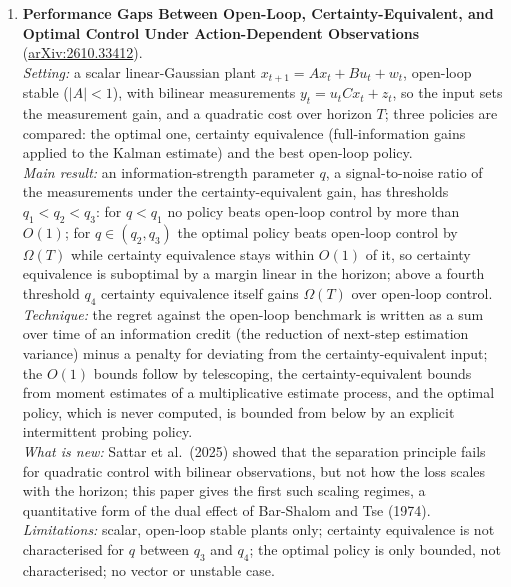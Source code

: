 \documentclass[11pt,a4paper]{article}
\newcommand{\ie}{\emph{i.e.},\ }
\begin{document}
\begin{enumerate}[leftmargin=*]
  \emph{Verdict:} an impossibility result for the regularity problem of sub-Riemannian geodesics, \ie of length-optimal controls, that is sharp in the step; confidence medium (full text; the general family is only announced).
  \item \textbf{Performance Gaps Between Open-Loop, Certainty-Equivalent, and Optimal Control Under Action-Dependent Observations}~\cite{maynardzhang2026performance} (\href{https://arxiv.org/abs/2610.33412}{arXiv:2610.33412}).\\
  \emph{Setting:} a scalar linear-Gaussian plant $x_{t+1} = Ax_t + Bu_t + w_t$, open-loop stable ($|A| < 1$), with bilinear measurements $y_t = u_t C x_t + z_t$, so the input sets the measurement gain, and a quadratic cost over horizon $T$; three policies are compared: the optimal one, certainty equivalence (full-information gains applied to the Kalman estimate) and the best open-loop policy.\\
  \emph{Main result:} an information-strength parameter $q$, a signal-to-noise ratio of the measurements under the certainty-equivalent gain, has thresholds $q_1 < q_2 < q_3$: for $q < q_1$ no policy beats open-loop control by more than $O(1)$; for $q \in (q_2, q_3)$ the optimal policy beats open-loop control by $\Omega(T)$ while certainty equivalence stays within $O(1)$ of it, so certainty equivalence is suboptimal by a margin linear in the horizon; above a fourth threshold $q_4$ certainty equivalence itself gains $\Omega(T)$ over open-loop control.\\
  \emph{Technique:} the regret against the open-loop benchmark is written as a sum over time of an information credit (the reduction of next-step estimation variance) minus a penalty for deviating from the certainty-equivalent input; the $O(1)$ bounds follow by telescoping, the certainty-equivalent bounds from moment estimates of a multiplicative estimate process, and the optimal policy, which is never computed, is bounded from below by an explicit intermittent probing policy.\\
  \emph{What is new:} Sattar et al.\ (2025) showed that the separation principle fails for quadratic control with bilinear observations, but not how the loss scales with the horizon; this paper gives the first such scaling regimes, a quantitative form of the dual effect of Bar-Shalom and Tse (1974).\\
  \emph{Limitations:} scalar, open-loop stable plants only; certainty equivalence is not characterised for $q$ between $q_3$ and $q_4$; the optimal policy is only bounded, not characterised; no vector or unstable case.\\

\end{enumerate}
\end{document}
